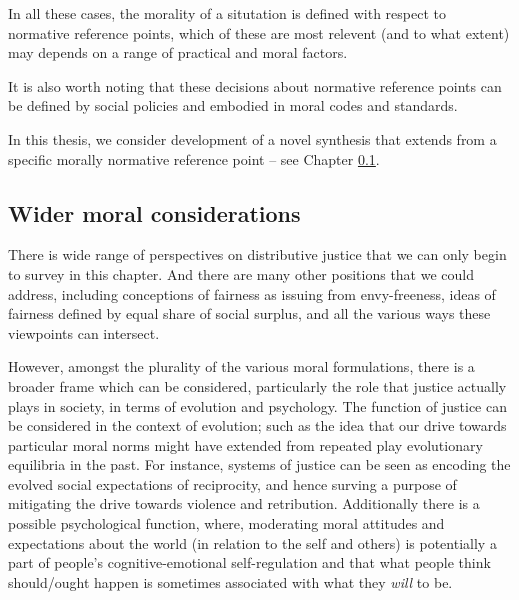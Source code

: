 
In all these cases, the morality of a situtation is defined with respect to normative reference points, which of these are most relevent (and to what extent) may depends on a range of practical and moral factors.

It is also worth noting that these decisions about normative reference points can be defined by social policies %
 and embodied in moral codes and standards.


In this thesis, we consider development of a novel synthesis that extends from a specific morally normative reference point -- see Chapter \ref{}. 


\subsection{Wider moral considerations}

There is wide range of perspectives on distributive justice that we can only begin to survey in this chapter.
And there are many other positions that we could address, including conceptions of fairness as issuing from envy-freeness, ideas of fairness defined by equal share of social surplus, and all the various ways these viewpoints can intersect.%

However, amongst the plurality of the various moral formulations, there is a broader frame which can be considered, particularly the role that justice actually plays in society, in terms of evolution and psychology.
The function of justice can be considered in the context of evolution; such as the idea that our drive towards particular moral norms might have extended from repeated play evolutionary equilibria in the past. \cite{Binmore10785}
For instance, systems of justice can be seen as encoding the evolved social expectations of reciprocity, and hence surving a purpose of mitigating the drive towards violence and retribution.
Additionally there is a possible psychological function, where, moderating moral attitudes and expectations about the world (in relation to the self and others) is potentially a part of people's cognitive-emotional self-regulation \cite{doi:10.1300/J135v02n04, doi:10.1037/1089-2680.6.1.25, LITZ2009695, doi:10.1080/00981389.2019.1640337}
and that what people think should/ought happen is sometimes associated with what they \textit{will} to be.\cite{doi:10.1080/13869795.2016.1212395, sep-moral-motivation}

